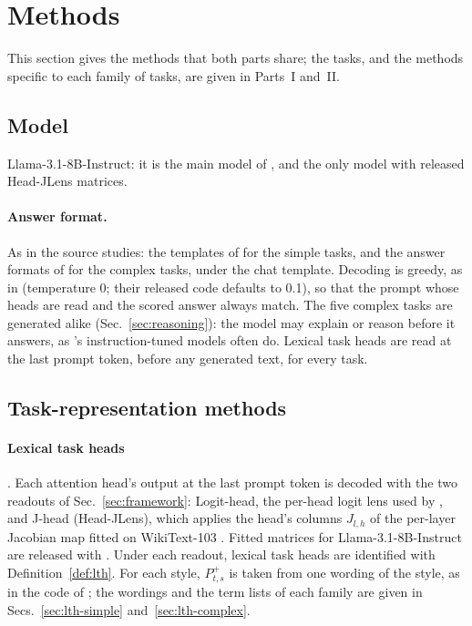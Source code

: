 \documentclass[11pt,a4paper]{article}
\begin{document}
\section{Methods}\label{sec:methods}

This section gives the methods that both parts share; the tasks, and the methods specific to each family of tasks, are given in Parts~I and~II.

\subsection{Model}\label{sec:model}
Llama-3.1-8B-Instruct: it is the main model of \citet{yang2026shared}, and the only model with released Head-JLens matrices.

\paragraph{Answer format.} As in the source studies: the templates of \citet{yang2026shared} for the simple tasks, and the answer formats of \citet[App.~F]{fu2026rules} for the complex tasks, under the chat template. Decoding is greedy, as in \citet[App.~A]{fu2026rules} (temperature 0; their released code defaults to 0.1), so that the prompt whose heads are read and the scored answer always match. The five complex tasks are generated alike (Sec.~\ref{sec:reasoning}): the model may explain or reason before it answers, as \citeauthor{fu2026rules}'s instruction-tuned models often do. Lexical task heads are read at the last prompt token, before any generated text, for every task.

\subsection{Task-representation methods}\label{sec:trmethods}
\paragraph{Lexical task heads} \citep[Sec.~2.2.2]{yang2026shared}.
Each attention head's output at the last prompt token is decoded with the two readouts of Sec.~\ref{sec:framework}: Logit-head, the per-head logit lens used by \citet{yang2026shared} \citep{nostalgebraist2020logitlens}, and J-head (Head-JLens), which applies the head's columns $J_{l,h}$ of the per-layer Jacobian map fitted on WikiText-103 \citep[Sec.~2]{merlo2026headjlens}. Fitted matrices for Llama-3.1-8B-Instruct are released with \citet[Sec.~S4]{merlo2026headjlens}.
Under each readout, lexical task heads are identified with Definition~\ref{def:lth}.
For each style, $P^{+}_{t,s}$ is taken from one wording of the style, as in the code of \citet{yang2026shared}; the wordings and the term lists of each family are given in Secs.~\ref{sec:lth-simple} and~\ref{sec:lth-complex}.
\end{document}
